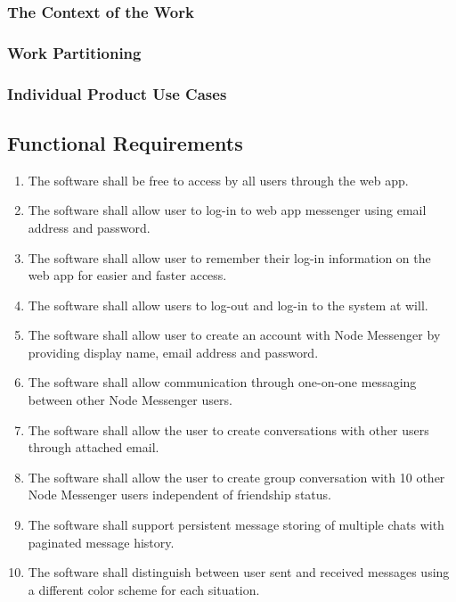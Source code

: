\documentclass[12pt, titlepage]{article}
\begin{document}
    		\subsubsection{The Context of the Work}
    		\subsubsection{Work Partitioning}
    		\subsubsection{Individual Product Use Cases}
           
           

    		
    		

    	\subsection{Functional Requirements}
	    \begin{enumerate}
		    \item The software shall be free to access by all users through the web app.
		    \item The software shall allow user to log-in to web app messenger using email address and password.
		    \item The software shall allow user to remember their log-in information on the web app for easier and faster access.
		    \item The software shall allow users to log-out and log-in to the system at will.
		    \item The software shall allow user to create an account with Node Messenger by providing display name, email address and password.
		    \item The software shall allow communication through one-on-one messaging between other Node Messenger users.
		    \item The software shall allow the user to create conversations with other users through attached email.
		    \item The software shall allow the user to create group conversation with 10 other Node Messenger users independent of friendship status.
		    \item The software shall support persistent message storing of multiple chats with paginated message history.
		    \item The software shall distinguish between user sent and received messages using a different color scheme for each situation.
		\end{enumerate}
	\newpage
\end{document}
